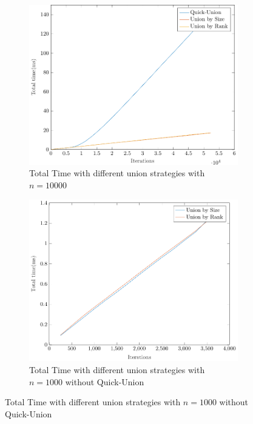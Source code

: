 \begin{figure}[ht]
\begin{subfigure}{0.32\textwidth}
    \end{subfigure}%
    \hfill
    \begin{subfigure}{0.32\textwidth}
        \centering
        \includegraphics[width=\textwidth]{../images/plotNCFull10000_time(ms).pdf}
        \caption{Total Time with different union strategies with $n = 10000$}
    \end{subfigure}
    \begin{subfigure}{0.32\textwidth}
        \centering
        \includegraphics[width=\textwidth]{../images/plotNCNonFull1000_time(ms).pdf}
        \caption{Total Time with different union strategies with $n = 1000$ without Quick-Union}
    \end{subfigure}%

\end{figure}
